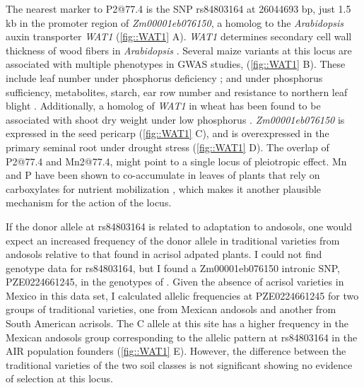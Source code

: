 The nearest marker to P2@77.4 is the SNP rs84803164 at 26044693 bp, just 1.5 kb in the promoter region of \textit{Zm00001eb076150}, a homolog to the \textit{Arabidopsis} auxin transporter \textit{WAT1} (\autoref{fig::WAT1} A). \textit{WAT1} determines secondary cell wall thickness of wood fibers in \textit{Arabidopsis} \citep{ranocha2013}. 
Several maize variants at this locus are associated with multiple phenotypes in GWAS studies, (\autoref{fig::WAT1} B).
These include leaf number under phosphorus deficiency  \citep{xu2018a}; and under phosphorus sufficiency, metabolites, starch, ear row number and resistance to northern leaf blight \citep{wallace2014a}. 
Additionally, a homolog of \textit{WAT1} in wheat has been found to be associated with shoot dry weight under low phosphorus \citep{dharmateja2022}. 
\textit{Zm00001eb076150} is expressed in the seed pericarp (\autoref{fig::WAT1} C), and is overexpressed in the primary seminal root under drought stress  (\autoref{fig::WAT1} D). 
The overlap of P2@77.4 and Mn2@77.4, might point to a single locus of pleiotropic effect. Mn and P have been shown to co-accumulate in leaves of plants that rely on carboxylates for nutrient mobilization \citep{lambers2015b}, which makes it another plausible mechanism for the action of the locus.

If the donor allele at rs84803164 is related to adaptation to andosols, one would expect an increased frequency of the donor allele in traditional varieties from andosols relative to that found in acrisol adpated plants. 
I could not find genotype data for rs84803164, but I found a Zm00001eb076150 
intronic SNP, PZE0224661245, in the genotypes of \citep{romero_navarro2017-cn}.
Given the absence of acrisol varieties in Mexico in this data set,  I calculated allelic frequencies at  PZE0224661245 for two groups of traditional varieties, one from Mexican andosols and another from South American acrisols.
The C allele at this site has a higher frequency in the Mexican andosols group corresponding to the allelic pattern at rs84803164 in the AIR population founders (\autoref{fig::WAT1} E).
However, the difference between the traditional varieties of the two soil classes is not significant showing no evidence of selection at this locus.

\clearpage

\printbibliography[heading=subbibintoc, title=References]
